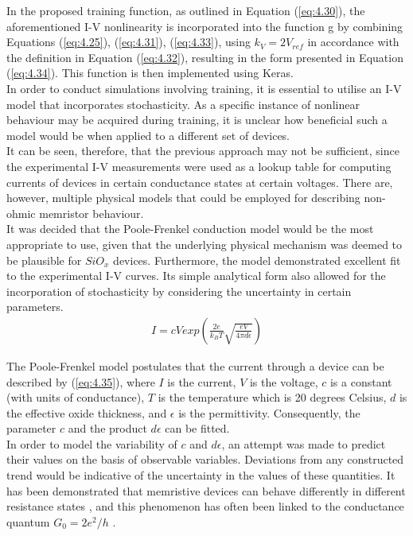 \noindent In the proposed training function, as outlined in Equation (\ref{eq:4.30}), the aforementioned I-V nonlinearity is incorporated into the function g by combining Equations (\ref{eq:4.25}), (\ref{eq:4.31}), (\ref{eq:4.33}), using $k_V = 2V_{ref}$ in accordance with the definition in Equation (\ref{eq:4.32}), resulting in the form presented in Equation (\ref{eq:4.34}). This function is then implemented using Keras.\\

\noindent In order to conduct simulations involving training, it is essential to utilise an I-V model that incorporates stochasticity. As a specific instance of nonlinear behaviour may be acquired during training, it is unclear how beneficial such a model would be when applied to a different set of devices. \\

\noindent It can be seen, therefore, that the previous approach may not be sufficient, since the experimental I-V measurements were used as a lookup table for computing currents of devices in certain conductance states at certain voltages. There are, however, multiple physical models that could be employed for describing non-ohmic memristor behaviour. \\

\noindent It was decided that the Poole-Frenkel conduction model \cite{joksas2022nonideality} would be the most appropriate to use, given that the underlying physical mechanism was deemed to be plausible for $SiO_x$ devices. Furthermore, the model demonstrated excellent fit to the experimental I-V curves. Its simple analytical form also allowed for the incorporation of stochasticity by considering the uncertainty in certain parameters.
\begin{align}
I = cV exp\left( \frac{2e}{k_BT} \sqrt{\frac{eV}{4\pi d\epsilon}} \right) \label{eq:4.35}
\end{align}

\noindent The Poole-Frenkel model postulates that the current through a device can be described by (\ref{eq:4.35}), where $I$ is the current, $V$ is the voltage, $c$ is a constant (with units of conductance), $T$ is the temperature which is 20 degrees Celsius, $d$ is the effective oxide thickness, and $\epsilon$ is the permittivity. Consequently, the parameter $c$ and the product $d\epsilon$ can be fitted.\\

\noindent In order to model the variability of $c$ and $d\epsilon$, an attempt was made to predict their values on the basis of observable variables. Deviations from any constructed trend would be indicative of the uncertainty in the values of these quantities. It has been demonstrated that memristive devices can behave differently in different resistance states \cite{mehonic2015structural}, and this phenomenon has often been linked to the conductance quantum $G_0 = 2e^2/h$ \cite{yi2016quantized}.\\

